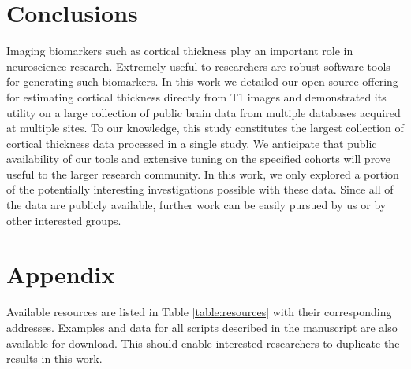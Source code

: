 \section{Conclusions}

Imaging biomarkers such as cortical thickness play an 
important role in neuroscience research.  Extremely useful to
researchers are robust software tools for generating such 
biomarkers.  In this work we detailed our open source offering for estimating
cortical thickness directly from T1 images and demonstrated
its utility on a large collection of public brain data from
multiple databases acquired at multiple sites.  To our knowledge,
this study constitutes the largest collection of cortical
thickness data processed in a single study.  
We anticipate that public availability of our tools and extensive tuning on
the specified cohorts will prove useful to the larger
research community.   In this work, we only explored a portion of the potentially
interesting investigations possible with these data.
Since all of the data are publicly available, further work can
be easily pursued by us or by other interested groups.


\section*{Appendix}

Available resources are listed in Table \ref{table:resources}
with their corresponding addresses.  Examples and
data for all scripts described in the manuscript are 
also available for download.  This should enable interested
researchers to duplicate the results in this work.

